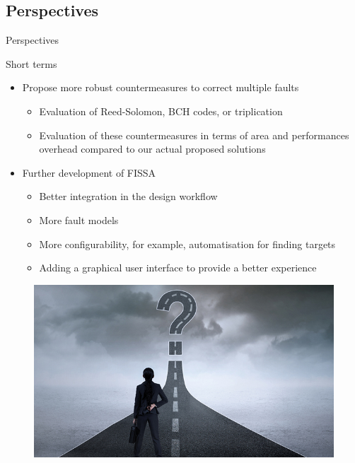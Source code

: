 \subsection{Perspectives}
\begin{frame}{Perspectives}
    \begin{block}{Short terms}
        \begin{itemize}
            [triangle]
            \item<1> Propose more robust countermeasures to correct multiple faults
                \begin{itemize}
                    \item Evaluation of Reed-Solomon, BCH codes, or triplication
                    \item Evaluation of these countermeasures in terms of area and performances overhead compared to our actual proposed solutions
                \end{itemize}
            \item<2> Further development of FISSA
                \begin{itemize}
                    \item Better integration in the design workflow
                    \item More fault models
                    \item More configurability, for example, automatisation for finding targets
                    \item Adding a graphical user interface to provide a better experience
                \end{itemize}
        \end{itemize}
    \end{block}
    
    \begin{figure}
        \centering
        \includegraphics[height=.25\textheight]{src/6_conclusion/img/perspectives.jpg}
    \end{figure}
\end{frame}
